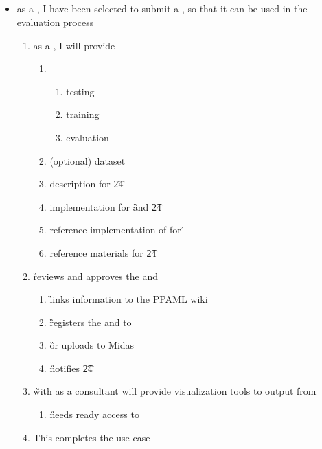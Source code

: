 \documentclass[8pt,letterpaper]{article} %
\newenvironment{slimlist}{
  \begin{itemize}
    \setlength{\topsep}{0pt}
    \setlength{\itemsep}{1pt}
    \setlength{\parsep}{0pt}
    \setlength{\parskip}{0pt}
}{\end{itemize}}
\newenvironment{mitemize}[1]{
  \begin{minipage}{\linewidth}
  \subsection*{#1}
  \begin{slimlist}
}{
\end{slimlist}
\end{minipage}
\vspace{1em}
}
\begin{document}
\begin{mitemize}{\de}
\item as a \de, I have been selected to submit a \cp, so that it can be used in the evaluation process
  \begin{enumerate}
    
  \item as a \de, I will provide 
    \begin{enumerate}
    \item \ds
      \begin{enumerate}
      \item testing
      \item training
      \item evaluation
      \end{enumerate}
    \item (optional) dataset  \gen
    \item \tev description for \t24
    \item \tev implementation for \G and \t24
    \item reference implementation of \sol for \G 
    \item reference materials for \t24 
    \end{enumerate}
  \item \G reviews and approves the \cp and 
    \begin{enumerate}
    \item \G links \cp information to the PPAML wiki
    \item \G registers the \ds and \cp to \ptk
    \item \G or \de uploads \ds to Midas
    \item \G notifies \t24
    \end{enumerate}
  \item \G with \de as a consultant will provide visualization tools to \rep output from 
    \begin{enumerate}
    \item \G needs ready access to \de
    \end{enumerate}
  \item This completes the use case
  \end{enumerate}
\end{mitemize}
\end{document}
